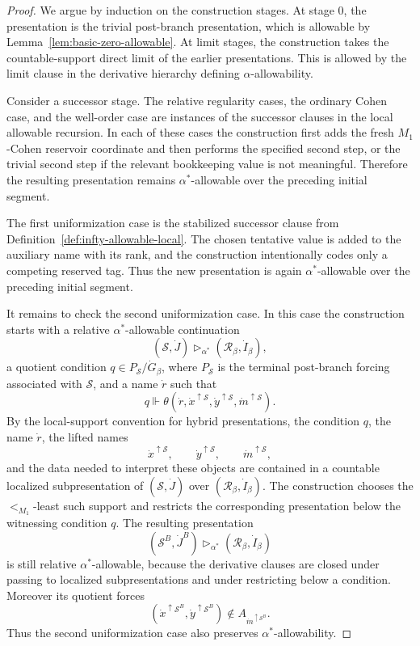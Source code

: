 \documentclass[a4paper,11pt]{article}
\begin{document}
\begin{proof}
We argue by induction on the construction stages.  At stage \(0\), the
presentation is the trivial post-branch presentation, which is allowable by
Lemma~\ref{lem:basic-zero-allowable}.  At limit stages, the construction takes
the countable-support direct limit of the earlier presentations.  This is
allowed by the limit clause in the derivative hierarchy defining
\(\alpha\)-allowability.

Consider a successor stage.  The relative regularity cases, the ordinary Cohen
case, and the well-order case are instances of the successor clauses in the
local allowable recursion.  In each of these cases the construction first adds
the fresh \(M_1\)-Cohen reservoir coordinate and then performs the specified
second step, or the trivial second step if the relevant bookkeeping value is not
meaningful.  Therefore the resulting presentation remains
\(\alpha^\ast\)-allowable over the preceding initial segment.

The first uniformization case is the stabilized successor clause from
Definition~\ref{def:infty-allowable-local}.  The chosen tentative value is added
to the auxiliary name with its rank, and the construction intentionally codes
only a competing reserved tag.  Thus the new presentation is again
\(\alpha^\ast\)-allowable over the preceding initial segment.

It remains to check the second uniformization case.  In this case the
construction starts with a relative \(\alpha^\ast\)-allowable continuation
\[
   (\mathcal S,\dot J)\triangleright_{\alpha^\ast}
   (\mathcal R_\beta,\dot I_\beta),
\]
a quotient condition \(q\in P_{\mathcal S}/\dot G_\beta\), where
\(P_{\mathcal S}\) is the terminal post-branch forcing associated with
\(\mathcal S\), and a name \(\dot r\) such that
\[
   q\Vdash
   \theta(\dot r,
      \dot x^{\uparrow\mathcal S},
      \dot y^{\uparrow\mathcal S},
      \dot m^{\uparrow\mathcal S}).
\]
By the local-support convention for hybrid presentations, the condition \(q\),
the name \(\dot r\), the lifted names
\[
   \dot x^{\uparrow\mathcal S},\qquad
   \dot y^{\uparrow\mathcal S},\qquad
   \dot m^{\uparrow\mathcal S},
\]
and the data needed to interpret these objects are contained in a countable
localized subpresentation of \((\mathcal S,\dot J)\) over
\((\mathcal R_\beta,\dot I_\beta)\).  The construction chooses the
\(<_{M_1}\)-least such support and restricts the corresponding presentation
below the witnessing condition \(q\).  The resulting presentation
\[
   (\mathcal S^B,\dot J^B)\triangleright_{\alpha^\ast}
   (\mathcal R_\beta,\dot I_\beta)
\]
is still relative \(\alpha^\ast\)-allowable, because the derivative clauses are
closed under passing to localized subpresentations and under restricting below a
condition.  Moreover its quotient forces
\[
   (\dot x^{\uparrow\mathcal S^B},
    \dot y^{\uparrow\mathcal S^B})
      \notin A_{\dot m^{\uparrow\mathcal S^B}}.
\]
Thus the second uniformization case also preserves
\(\alpha^\ast\)-allowability.


\end{proof}
\end{document}
